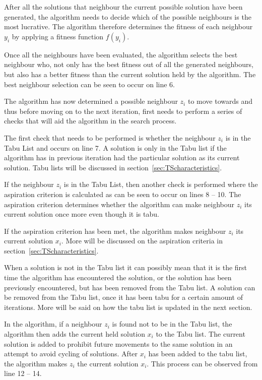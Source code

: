 After all the solutions that neighbour the current possible solution have been generated, the algorithm needs to decide which of the possible neighbours is the most lucrative. The algorithm therefore determines the fitness of each neighbour $y_i$ by applying a fitness function $f(y_i)$. 

Once all the neighbours have been evaluated, the algorithm selects the best neighbour who, not only has the best fitness out of all the generated neighbours, but also has a better fitness than the current solution held by the algorithm. The best neighbour selection can be seen to occur on line 6.

The algorithm has now determined a possible neighbour $z_i$ to move towards and thus before moving on to the next iteration, first needs to perform a series of checks that will aid the algorithm in the search process.

The first check that needs to be performed is whether the neighbour $z_i$ is in the Tabu List and occurs on line 7. A solution is only in the Tabu list if the algorithm has in previous iteration had the particular solution as its current solution. Tabu lists will be discussed in section~\ref{sec:TScharacteristics}.

If the neighbour $z_i$ is in the Tabu List, then another check is performed where the aspiration criterion is calculated as can be seen to occur on lines 8 -- 10. The aspiration criterion determines whether the algorithm can make neighbour $z_i$ its current solution once more even though it is tabu. 

If the aspiration criterion has been met, the algorithm makes neighbour $z_i$ its current solution $x_i$. More will be discussed on the aspiration criteria in section~\ref{sec:TScharacteristics}.

When a solution is not in the Tabu list it can possibly mean that it is the first time the algorithm has encountered the solution, or the solution has been previously encountered, but has been removed from the Tabu list. A solution can be removed from the Tabu list, once it has been tabu for a certain amount of iterations. More will be said on how the tabu list is updated in the next section.

In the algorithm, if a neighbour $z_i$ is found not to be in the Tabu list, the algorithm then adds the current held solution $x_i$ to the Tabu list. The current solution is added to prohibit future movements to the same solution in an attempt to avoid cycling of solutions. After $x_i$ has been added to the tabu list, the algorithm makes $z_i$ the current solution $x_i$. This process can be observed from line 12 -- 14.

